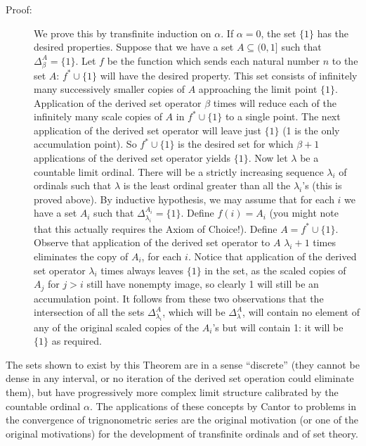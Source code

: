 \documentclass[12pt]{book}
\begin{document}
\begin{description}
\item[Proof:] We prove this by transfinite induction on $\alpha$.  If
$\alpha=0$, the set $\{1\}$ has the desired properties.  Suppose that
we have a set $A\subseteq (0,1]$ such that $\Delta^A_{\beta}=\{1\}$.
Let $f$ be the function which sends each natural number $n$ to the set
$A$: $f^* \cup \{1\}$ will have the desired property.  This set
consists of infinitely many successively smaller copies of $A$
approaching the limit point $\{1\}$.  Application of the derived set
operator $\beta$ times will reduce each of the infinitely many scale
copies of $A$ in $f^* \cup \{1\}$ to a single point.  The next
application of the derived set operator will leave just $\{1\}$ (1 is
the only accumulation point).  So $f^* \cup \{1\}$ is the desired set
for which $\beta+1$ applications of the derived set operator yields
$\{1\}$.  Now let $\lambda$ be a countable limit ordinal.  There will
be a strictly increasing sequence $\lambda_i$ of ordinals such that
$\lambda$ is the least ordinal greater than all the $\lambda_i$'s
(this is proved above).  By inductive hypothesis, we may assume that
for each $i$ we have a set $A_i$ such that
$\Delta^{A_i}_{\lambda_i}=\{1\}$.  Define $f(i) = A_i$ (you might note
that this actually requires the Axiom of Choice!).  Define $A=f^* \cup
\{1\}$.  Observe that application of the derived set operator to $A$
$\lambda_i+1$ times eliminates the copy of $A_i$, for each $i$.
Notice that application of the derived set operator $\lambda_i$ times
always leaves $\{1\}$ in the set, as the scaled copies of $A_{j}$ for
$j>i$ still have nonempty image, so clearly 1 will still be an
accumulation point.  It follows from these two observations that the
intersection of all the sets $\Delta^A_{\lambda_i}$, which will be
$\Delta^A_{\lambda}$, will contain no element of any of the original
scaled copies of the $A_i$'s but will contain 1: it will be $\{1\}$ as
required.

\end{description}

The sets shown to exist by this Theorem are in a sense ``discrete''
(they cannot be dense in any interval, or no iteration of the derived
set operation could eliminate them), but have progressively more
complex limit structure calibrated by the countable ordinal $\alpha$.
The applications of these concepts by Cantor to problems in the
convergence of trignonometric series are the original motivation (or
one of the original motivations) for the development of transfinite
ordinals and of set theory.
\end{document}
